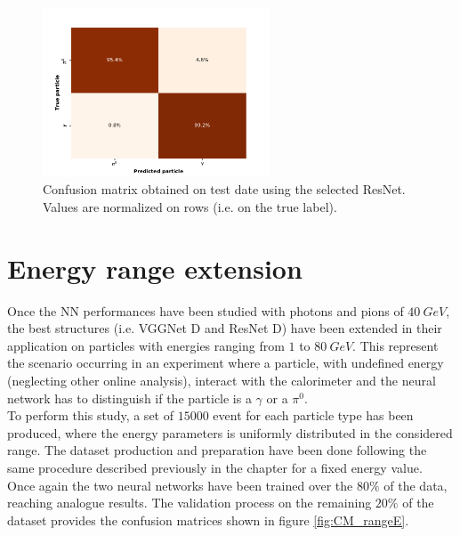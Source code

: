 \begin{figure}
	\centering
	\includegraphics[width=0.6\textwidth]{IMG/Cap6/ResNet-D_ConfMatrix.pdf}
	\caption{Confusion matrix obtained on test date  using the selected ResNet. Values are normalized on rows (i.e. on the true label).}
	\label{fig:ResNet-cm}
\end{figure}

\section{Energy range extension}
Once the NN performances have been studied with photons and pions of $40\ GeV$, the best structures (i.e. VGGNet D and ResNet D) have been extended in their application on particles with energies ranging from $1$ to $80\ GeV$.
This represent the scenario occurring in an experiment where a particle, with undefined energy (neglecting other online analysis), interact with the calorimeter and the neural network has to distinguish if the particle is a $\gamma$ or a $\pi^0$.\\

To perform this study, a set of $15000$ event for each particle type has been produced, where the energy parameters is uniformly distributed in the considered range.
The dataset production and preparation have been done following the same procedure described previously in the chapter for a fixed energy value.\\
Once again the two neural networks have been trained over the $80\%$ of the data, reaching analogue results. The validation process on the remaining $20\%$ of the dataset provides the confusion matrices shown in figure \ref{fig:CM_rangeE}.

